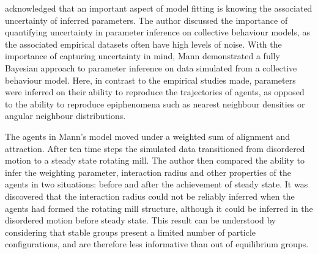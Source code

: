 \textcite{mann11} acknowledged that an important aspect of model fitting is knowing the
associated uncertainty of inferred parameters. The author discussed  the
importance of quantifying uncertainty in parameter inference on collective behaviour
models, as the associated empirical datasets often have high levels of noise. With the
importance of capturing uncertainty in mind, Mann demonstrated a fully Bayesian approach
to parameter inference on data simulated from a collective behaviour model. Here, in
contrast to the empirical studies made, parameters were inferred on their ability to
reproduce the trajectories of agents, as opposed to the ability to reproduce epiphenomena
such as nearest neighbour densities or angular neighbour distributions.

The agents in Mann's model moved under a weighted sum of alignment and attraction. After
ten time steps the simulated data transitioned from disordered motion to a steady state
rotating mill. The author then compared the ability to infer the weighting parameter,
interaction radius and other properties of the agents in two situations: before and after
the achievement of steady state. It was discovered that the interaction radius could not
be reliably inferred when the agents had formed the rotating mill structure, although it
could be inferred in the disordered motion before steady state.  This result can be
understood by considering that stable groups present a limited number of particle
configurations, and are therefore less informative than out of equilibrium groups.
